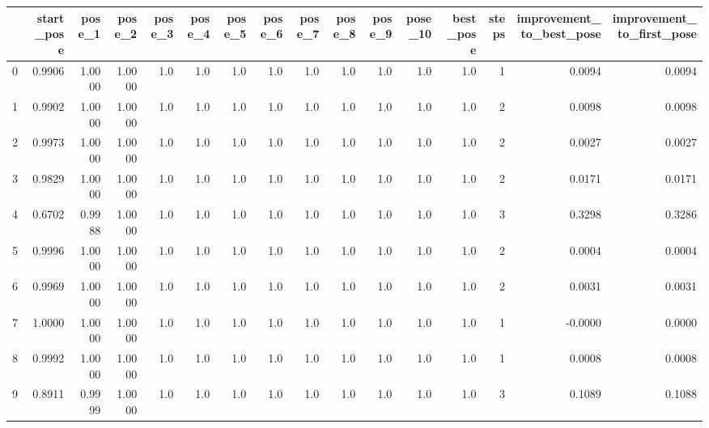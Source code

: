 \begin{tabular}{lrrrrrrrrrrrrrrr}
\toprule
{} &  start\_pose &  pose\_1 &  pose\_2 &  pose\_3 &  pose\_4 &  pose\_5 &  pose\_6 &  pose\_7 &  pose\_8 &  pose\_9 &  pose\_10 &  best\_pose &  steps &  improvement\_to\_best\_pose &  improvement\_to\_first\_pose \\
\midrule
0   &      0.9906 &  1.0000 &  1.0000 &     1.0 &     1.0 &     1.0 &     1.0 &     1.0 &     1.0 &     1.0 &      1.0 &        1.0 &      1 &                    0.0094 &                     0.0094 \\
1   &      0.9902 &  1.0000 &  1.0000 &     1.0 &     1.0 &     1.0 &     1.0 &     1.0 &     1.0 &     1.0 &      1.0 &        1.0 &      2 &                    0.0098 &                     0.0098 \\
2   &      0.9973 &  1.0000 &  1.0000 &     1.0 &     1.0 &     1.0 &     1.0 &     1.0 &     1.0 &     1.0 &      1.0 &        1.0 &      2 &                    0.0027 &                     0.0027 \\
3   &      0.9829 &  1.0000 &  1.0000 &     1.0 &     1.0 &     1.0 &     1.0 &     1.0 &     1.0 &     1.0 &      1.0 &        1.0 &      2 &                    0.0171 &                     0.0171 \\
4   &      0.6702 &  0.9988 &  1.0000 &     1.0 &     1.0 &     1.0 &     1.0 &     1.0 &     1.0 &     1.0 &      1.0 &        1.0 &      3 &                    0.3298 &                     0.3286 \\
5   &      0.9996 &  1.0000 &  1.0000 &     1.0 &     1.0 &     1.0 &     1.0 &     1.0 &     1.0 &     1.0 &      1.0 &        1.0 &      2 &                    0.0004 &                     0.0004 \\
6   &      0.9969 &  1.0000 &  1.0000 &     1.0 &     1.0 &     1.0 &     1.0 &     1.0 &     1.0 &     1.0 &      1.0 &        1.0 &      2 &                    0.0031 &                     0.0031 \\
7   &      1.0000 &  1.0000 &  1.0000 &     1.0 &     1.0 &     1.0 &     1.0 &     1.0 &     1.0 &     1.0 &      1.0 &        1.0 &      1 &                   -0.0000 &                     0.0000 \\
8   &      0.9992 &  1.0000 &  1.0000 &     1.0 &     1.0 &     1.0 &     1.0 &     1.0 &     1.0 &     1.0 &      1.0 &        1.0 &      1 &                    0.0008 &                     0.0008 \\
9   &      0.8911 &  0.9999 &  1.0000 &     1.0 &     1.0 &     1.0 &     1.0 &     1.0 &     1.0 &     1.0 &      1.0 &        1.0 &      3 &                    0.1089 &                     0.1088 \\

\end{tabular}
